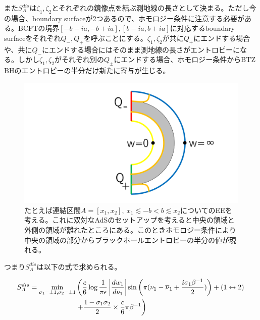 また$S_A^{dis}$は$\zeta_1,\zeta_2$とそれぞれの鏡像点を結ぶ測地線の長さとして決まる。ただし今の場合、boundary surfaceが2つあるので、ホモロジー条件に注意する必要がある。BCFTの境界$[-b-ia,-b+ia],[b-ia,b+ia]$に対応するboundary surfaceをそれぞれ$Q_-,Q_+$を呼ぶことにする。$\zeta_1,\zeta_2$が共に$Q_+$にエンドする場合や、共に$Q_-$にエンドする場合にはそのまま測地線の長さがエントロピーになる。しかし$\zeta_1,\zeta_2$がそれぞれ別の$Q_{\pm}$にエンドする場合、ホモロジー条件からBTZ BHのエントロピーの半分だけ新たに寄与が生じる。
\begin{figure}[h]
	\centering
	\includegraphics[width=0.7\linewidth]{DQadsgeod.pdf}
	\caption{たとえば連結区間$A=[x_1,x_2],\ x_1\lesssim -b<b\lesssim x_2$についてのEEを考える。これに双対なAdSのセットアップを考えると中央の領域と外側の領域が離れたところにある。このときホモロジー条件により中央の領域の部分からブラックホールエントロピーの半分の値が現れる。}
	\label{fig:dqadsgeod}
\end{figure}

つまり$S_A^{dis}$は以下の式で求められる。

\begin{align}
S_A^{dis}=\min_{\sigma_1=\pm 1,\sigma_2=\pm 1}&\left( \frac{c}{6}\log \frac{1}{\pi\epsilon}\left|\frac{dw_1}{d\nu_1}\right| \sin\left(\pi(\nu_1-\overline{\nu}_1+\frac{i \sigma_1\beta^{-1}}{2})\right)+(1\leftrightarrow 2)\right.\notag\\
&\left.+\frac{1-\sigma_1\sigma_2}{2}\times \frac{c}{6}\pi\beta^{-1}\right)
\end{align}

